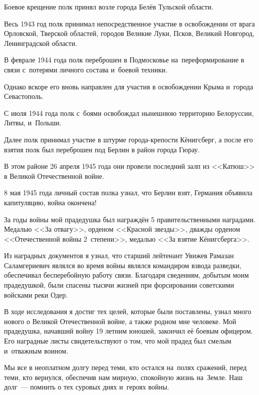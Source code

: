Боевое крещение полк принял возле города Белёв Тульской области.

Весь 1943 год полк принимал непосредственное участие в освобождении от врага Орловской, Тверской областей, городов Великие Луки, Псков, Великий Новгород, Ленинградской области.

В феврале 1944 года полк переброшен в Подмосковье на~переформирование в связи с~потерями личного состава и~боевой техники.

Однако вскоре его вновь направлен для участия в освобождении Крыма и~города Севастополь.

С июля 1944 года полк с~боями освобождал нынешнюю территорию Белоруссии, Литвы, и~Польши.

Далее полк принимал участие в штурме города-крепости Кёнигсберг, а после его взятия полк был переброшен под Берлин в район города Гюрау.

В этом районе 26 апреля 1945 года они провели последний залп из <<Катюш>> в Великой Отечественной войне.

8 мая 1945 года личный состав полка узнал, что Берлин взят, Германия объявила капитуляцию, война окончена!

За годы войны мой прадедушка был награждён 5 правительственными наградами. Медалью <<За отвагу>>, орденом <<Красной звезды>>, дважды орденом <<Отечественной войны 2~степени>>, медалью <<За взятие Кёнигсберга>>.

Из наградных документов я узнал, что старший лейтенант Увижев Рамазан Саламгериевич являлся во время войны являлся командиром взвода разведки, обеспечивал бесперебойную работу связи. Благодаря сведениям, добытым моим прадедушкой, были спасены тысячи жизней при форсировании советскими войсками реки Одер.

В ходе исследования я достиг тех целей, которые были поставлены, узнал много нового о Великой Отечественной войне, а также родном мне человеке. Мой прадедушка, начавший войну 19 летним юношей, закончил её боевым офицером. Его наградные листы свидетельствуют о том, что мой прадед был смелым и~отважным воином.

Мы все в неоплатном долгу перед теми, кто остался на~полях сражений, перед теми, кто вернулся, обеспечив нам мирную, спокойную жизнь на~Земле. Наш долг~--- помнить о тех суровых днях и~героях войны.
